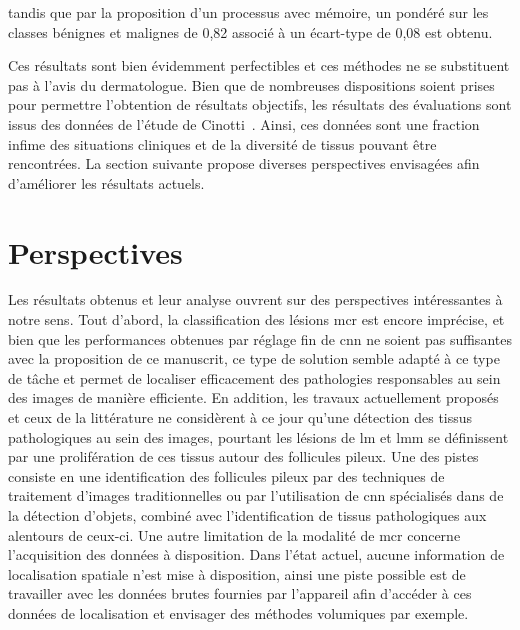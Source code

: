 tandis que par la proposition d'un processus avec mémoire, un \fscore{} pondéré sur les classes bénignes et malignes de 0,82 associé à un écart-type de 0,08 est obtenu.\par

Ces résultats sont bien évidemment perfectibles et ces méthodes ne se substituent pas à l'avis du dermatologue. Bien que de nombreuses dispositions soient prises pour permettre l'obtention de résultats objectifs, les résultats des évaluations sont issus des données de l'étude de Cinotti~. Ainsi, ces données sont une fraction infime des situations cliniques et de la diversité de tissus pouvant être rencontrées. La section suivante propose diverses perspectives envisagées afin d'améliorer les résultats actuels.\par
\clearpage

\section*{Perspectives}
Les résultats obtenus et leur analyse ouvrent sur des perspectives intéressantes à notre sens. Tout d'abord, la classification des lésions \gls{mcr} est encore imprécise, et bien que les performances obtenues par réglage fin de \gls{cnn} ne soient pas suffisantes avec la proposition de ce manuscrit, ce type de solution semble adapté à ce type de tâche et permet de localiser efficacement des pathologies responsables au sein des images de manière efficiente. En addition, les travaux actuellement proposés et ceux de la littérature ne considèrent à ce jour qu'une détection des tissus pathologiques au sein des images, pourtant les lésions de \gls{lm} et \gls{lmm} se définissent par une prolifération de ces tissus autour des follicules pileux. Une des pistes consiste en une identification des follicules pileux par des techniques de traitement d'images traditionnelles ou par l'utilisation de \gls{cnn} spécialisés dans de la détection d'objets, combiné avec l'identification de tissus pathologiques aux alentours de ceux-ci. Une autre limitation de la modalité de \gls{mcr} concerne l'acquisition des données à disposition. Dans l'état actuel, aucune information de localisation spatiale n'est mise à disposition, ainsi une piste possible est de travailler avec les données brutes fournies par l'appareil afin d'accéder à ces données de localisation et envisager des méthodes volumiques par exemple.\par

